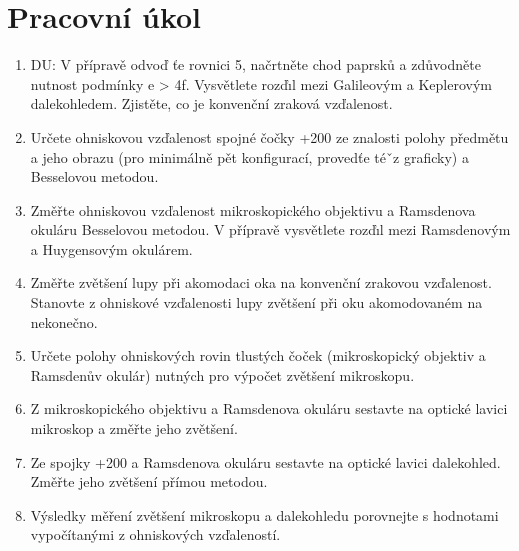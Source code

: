 \section{Pracovní úkol}
\begin{enumerate}
\item DU: V přípravě odvoď ťe rovnici 5, načrtněte chod paprsků a zdůvodněte nutnost
podmínky e > 4f. Vysvětlete rozďıl mezi Galileovým a Keplerovým dalekohledem.
Zjistěte, co je konvenční zraková vzďalenost.
\item Určete ohniskovou vzďalenost spojné čočky +200 ze znalosti polohy předmětu a jeho obrazu
(pro minimálně pět konfigurací, provedťe téˇz graficky) a Besselovou metodou.
\item Změřte ohniskovou vzďalenost mikroskopického objektivu a Ramsdenova okuláru Besselovou
metodou. V přípravě vysvětlete rozďıl mezi Ramsdenovým a Huygensovým okulárem.
\item Změřte zvětšení lupy při akomodaci oka na konvenční zrakovou vzďalenost. Stanovte z ohniskové
vzďalenosti lupy zvětšení při oku akomodovaném na nekonečno.
\item Určete polohy ohniskových rovin tlustých čoček (mikroskopický objektiv a Ramsdenův okulár)
nutných pro výpočet zvětšení mikroskopu.
\item Z mikroskopického objektivu a Ramsdenova okuláru sestavte na optické lavici mikroskop a
změřte jeho zvětšení.
\item Ze spojky +200 a Ramsdenova okuláru sestavte na optické lavici dalekohled. Změřte jeho
zvětšení přímou metodou.
\item Výsledky měření zvětšení mikroskopu a dalekohledu porovnejte s hodnotami vypočítanými
z ohniskových vzďaleností.
\end{enumerate}

